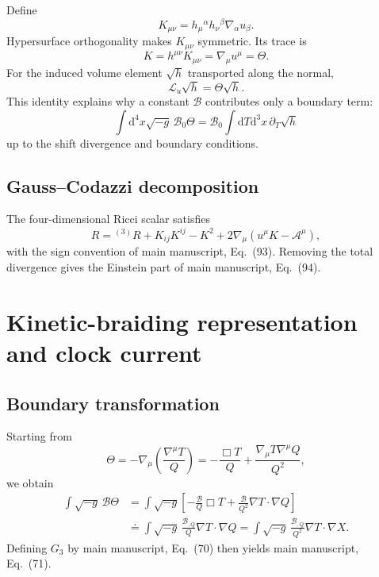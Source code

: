 \documentclass[aps,prd,reprint,onecolumn,notitlepage,nofootinbib,longbibliography,floatfix]{revtex4-2}
\theoremstyle{scstyle}
\theoremstyle{definition}
\theoremstyle{remark}
\newcommand{\dd}{\mathrm{d}}
\newcommand{\cB}{\mathcal B}
\newcommand{\cA}{\mathcal A}
\newcommand{\Lie}{\mathcal L}
\begin{document}
Define
\begin{equation}
K_{\mu\nu}=h_\mu{}^\alpha h_\nu{}^\beta\nabla_\alpha u_\beta.
\label{eq:Kcov}
\end{equation}
Hypersurface orthogonality makes $K_{\mu\nu}$ symmetric. Its trace is
\begin{equation}
K=h^{\mu\nu}K_{\mu\nu}=\nabla_\mu u^\mu=\Theta.
\label{eq:Kthetaapp}
\end{equation}
For the induced volume element $\sqrt h$ transported along the normal,
\begin{equation}
\Lie_u\sqrt h=\Theta\sqrt h.
\label{eq:volumeevolution}
\end{equation}
This identity explains why a constant $\cB$ contributes only a boundary term:
\begin{equation}
\int\dd^4x\sqrt{-g}\,\cB_0\Theta
=\cB_0\int\dd T\dd^3x\,\partial_T\sqrt h
\label{eq:Bboundary}
\end{equation}
up to the shift divergence and boundary conditions.

\subsection{Gauss--Codazzi decomposition}

The four-dimensional Ricci scalar satisfies
\begin{equation}
R={}^{(3)}R+K_{ij}K^{ij}-K^2
+2\nabla_\mu\left(u^\mu K-\cA^\mu\right),
\label{eq:GaussCodazzi}
\end{equation}
with the sign convention of main manuscript, Eq.~(93). Removing the total divergence gives the Einstein part of main manuscript, Eq.~(94).

\section{Kinetic-braiding representation and clock current}
\label{app:braiding}

\subsection{Boundary transformation}

Starting from
\begin{equation}
\Theta=-\nabla_\mu\left(\frac{\nabla^\mu T}{Q}\right)
=-\frac{\Box T}{Q}
+\frac{\nabla_\mu T\nabla^\mu Q}{Q^2},
\label{eq:thetaT}
\end{equation}
we obtain
\begin{align}
\int\sqrt{-g}\,\cB\Theta
&=\int\sqrt{-g}\left[-\frac{\cB}{Q}\Box T
+\frac{\cB}{Q^2}\nabla T\cdot\nabla Q\right]\nonumber\\
&\doteq\int\sqrt{-g}\,
\frac{\cB_{,Q}}{Q}\nabla T\cdot\nabla Q
=\int\sqrt{-g}\,
\frac{\cB_{,Q}}{Q^2}\nabla T\cdot\nabla X.
\label{eq:Bboundaryfull}
\end{align}
Defining $G_3$ by main manuscript, Eq.~(70) then yields main manuscript, Eq.~(71).
\end{document}

